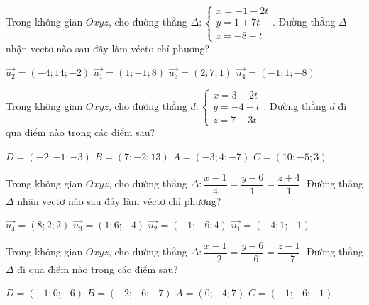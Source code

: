 \documentclass[12pt,a4paper]{article}
\begin{document}
\begin{ex}
 Trong không gian ${Oxyz}$, cho đường thẳng ${\Delta}:\left\{ \begin{array}{l}x = -1-2t\\ y = 1+7t\\z = -8-t\end{array} \right.$. Đường thẳng ${\Delta}$ nhận vectơ nào sau đây làm véctơ chỉ phương?
 
\choice
{ \True $\overrightarrow{u_2}=(-4;14;-2)$ }
   { $\overrightarrow{u_1}=(1;-1;8)$ }
     { $\overrightarrow{u_3}=(2;7;1)$ }
    { $\overrightarrow{u_4}=(-1;1;-8)$ }
\end{ex}

\begin{ex}
 Trong không gian ${Oxyz}$, cho đường thẳng ${d}:\left\{ \begin{array}{l}x = 3-2t\\ y = -4-t\\z = 7-3t\end{array} \right.$. Đường thẳng ${d}$ đi qua điểm nào trong các điểm sau?
 
\choice
{ $D=(-2;-1;-3)$ }
   { \True $B=(7;-2;13)$ }
     { $A=(-3;4;-7)$ }
    { $C=(10;-5;3)$ }
\end{ex}

\begin{ex}
 Trong không gian ${Oxyz}$, cho đường thẳng ${\Delta}:\dfrac{x - 1}{4}=\dfrac{y - 6}{1}=\dfrac{z + 4}{1}$. Đường thẳng ${\Delta}$ nhận vectơ nào sau đây làm véctơ chỉ phương?
 
\choice
{ \True $\overrightarrow{u_4}=(8;2;2)$ }
   { $\overrightarrow{u_3}=(1;6;-4)$ }
     { $\overrightarrow{u_2}=(-1;-6;4)$ }
    { $\overrightarrow{u_1}=(-4;1;-1)$ }
\end{ex}

\begin{ex}
 Trong không gian ${Oxyz}$, cho đường thẳng ${\Delta}:\dfrac{x - 1}{-2}=\dfrac{y - 6}{-6}=\dfrac{z - 1}{-7}$. Đường thẳng ${\Delta}$ đi qua điểm nào trong các điểm sau?
 
\choice
{ \True $D=(-1;0;-6)$ }
   { $B=(-2;-6;-7)$ }
     { $A=(0;-4;7)$ }
    { $C=(-1;-6;-1)$ }
\end{ex}
\end{document}
